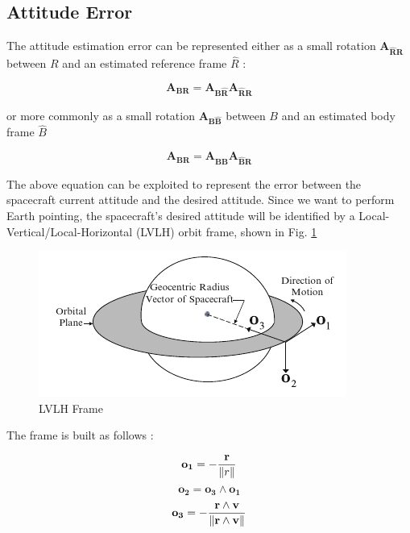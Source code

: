 \documentclass[11pt,a4paper]{report}
\begin{document}
\subsection{Attitude Error}
The attitude estimation error can be represented either as a small rotation $\mathbf{A_{\hat{R}R}}$ between $R$ and an estimated reference frame $\hat{R}$ :

\begin{equation*}
 \mathbf{A_{BR}} = \mathbf{A_{B \hat{R}}} \mathbf{A_{\hat{R}R}}
\end{equation*}

or more commonly as a small rotation $\mathbf{A_{B \hat{B}}}$ between $B$ and an estimated body frame $\hat{B}$

\begin{equation*}
 \mathbf{A_{BR}} = \mathbf{A_{\hat{B}B}} \mathbf{A_{\hat{B}R}}
\end{equation*}

The above equation can be exploited to represent the error between the spacecraft current attitude and the desired attitude.
Since we want to perform Earth pointing, the spacecraft's desired attitude will be identified by a Local-Vertical/Local-Horizontal (LVLH) orbit frame, shown in Fig. \ref{fig:lvlh}

\begin{figure}[H]
 	\centering
 	\includegraphics[scale=0.6]{gfx/lvlh.png}
    \caption{LVLH Frame}
    \label{fig:lvlh}
\end{figure}

The frame is built as follows : 

\begin{equation*}
 \mathbf{o_1} = - \frac{\mathbf{r}}{\left\lVert r\right\rVert} 
\end{equation*}
\begin{equation*}
 \mathbf{o_2} = \mathbf{o_3} \wedge \mathbf{o_1}
\end{equation*}
\begin{equation*}
 \mathbf{o_3} = - \frac{\mathbf{r} \wedge \mathbf{v}}{\left\lVert\mathbf{r} \wedge \mathbf{v}\right\rVert}
\end{equation*}
\end{document}
